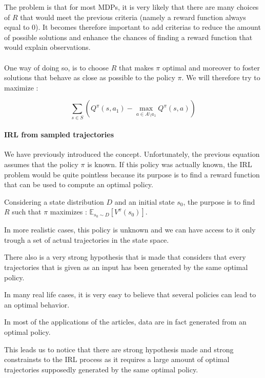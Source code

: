 \documentclass{article}
\begin{document}
The problem is that for most MDPs, it is very likely that there are many choices of $R$ that would meet the previous criteria (namely a reward function always equal to 0). It becomes therefore important to add criterias to reduce the amount of possible solutions and enhance the chances of finding a reward function that would explain observations.

\paragraph{}
One way of doing so, is to choose $R$ that makes $\pi$ optimal and moreover to foster solutions that behave as close as possible to the policy $\pi$. We will therefore try to maximize :

\[
\sum _{s \in S}\left(Q^\pi(s, a_1) - \max_{a \in A \setminus a_1} Q^\pi(s,a)\right)
\]


\paragraph{IRL from sampled trajectories}

We have previously introduced the concept. Unfortunately, the previous equation assumes that the policy $\pi$ is known. If this policy was actually known, the IRL problem would be quite pointless because its purpose is to find a reward function that can be used to compute an optimal policy.

Considering a state distribution $D$ and an initial state $s_{0}$, the purpose is to find $R$ such that $\pi$ maximizes :
$\mathbb E_{ s_{ 0 }\sim D }\left[ { V }^{ \pi  }({ s }_{ 0 }) \right]$.

In more realistic cases, this policy is unknown and we can have access to it only trough a set of actual trajectories in the state space.

There also is a very strong hypothesis that is made that considers that every trajectories that is given as an input has been generated by the same optimal policy.

In many real life cases, it is very easy to believe that several policies can lead to an optimal behavior.

In most of the applications of the articles, data are in fact generated from an optimal policy.

This leads us to notice that there are strong hypothesis made and strong constrainsts to the IRL process as it requires a large amount of optimal trajectories supposedly generated by the same optimal policy.
\end{document}
